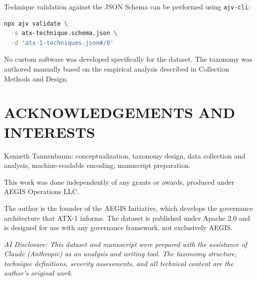 \documentclass{IEEEoj-data}
\begin{document}
Technique validation against the JSON Schema can be performed using \texttt{ajv-cli}:

\begin{lstlisting}[language=bash]
npx ajv validate \
  -s atx-technique.schema.json \
  -d 'atx-1-techniques.json#/0'
\end{lstlisting}

No custom software was developed specifically for the dataset. The taxonomy was authored manually based on the empirical analysis described in Collection Methods and Design.


\section*{ACKNOWLEDGEMENTS AND INTERESTS}

Kenneth Tannenbaum: conceptualization, taxonomy design, data collection and analysis, machine-readable encoding, manuscript preparation.

This work was done independently of any grants or awards, produced under AEGIS Operations LLC.

The author is the founder of the AEGIS Initiative, which develops the governance architecture that ATX-1 informs. The dataset is published under Apache 2.0 and is designed for use with any governance framework, not exclusively AEGIS.

{\it AI Disclosure: This dataset and manuscript were prepared with the assistance of Claude (Anthropic) as an analysis and writing tool. The taxonomy structure, technique definitions, severity assessments, and all technical content are the author's original work.}
\end{document}
